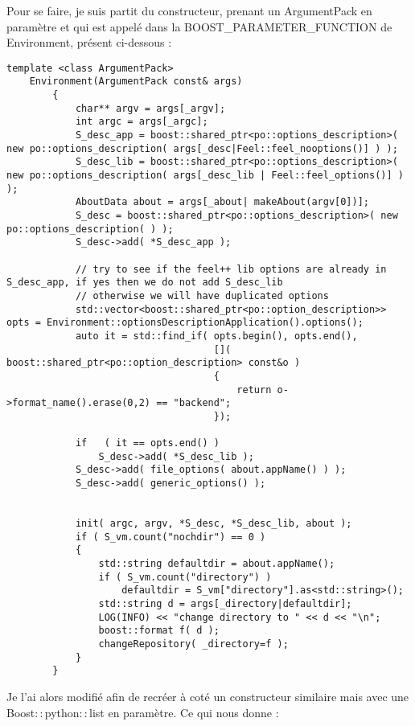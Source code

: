 \documentclass[12pt]{article}
\begin{document}
Pour se faire, je suis partit du constructeur, prenant un ArgumentPack en paramètre et qui est appelé dans la BOOST\_PARAMETER\_FUNCTION de Environment, présent ci-dessous :
\newline
\begin{lstlisting}
template <class ArgumentPack>
    Environment(ArgumentPack const& args)
        {
            char** argv = args[_argv];
            int argc = args[_argc];
            S_desc_app = boost::shared_ptr<po::options_description>( new po::options_description( args[_desc|Feel::feel_nooptions()] ) );
            S_desc_lib = boost::shared_ptr<po::options_description>( new po::options_description( args[_desc_lib | Feel::feel_options()] ) );
            AboutData about = args[_about| makeAbout(argv[0])];
            S_desc = boost::shared_ptr<po::options_description>( new po::options_description( ) );
            S_desc->add( *S_desc_app );

            // try to see if the feel++ lib options are already in S_desc_app, if yes then we do not add S_desc_lib
            // otherwise we will have duplicated options
            std::vector<boost::shared_ptr<po::option_description>> opts = Environment::optionsDescriptionApplication().options();
            auto it = std::find_if( opts.begin(), opts.end(),
                                    []( boost::shared_ptr<po::option_description> const&o )
                                    {
                                        return o->format_name().erase(0,2) == "backend";
                                    });

            if   ( it == opts.end() )
                S_desc->add( *S_desc_lib );
            S_desc->add( file_options( about.appName() ) );
            S_desc->add( generic_options() );


            init( argc, argv, *S_desc, *S_desc_lib, about );
            if ( S_vm.count("nochdir") == 0 )
            {
                std::string defaultdir = about.appName();
                if ( S_vm.count("directory") )
                    defaultdir = S_vm["directory"].as<std::string>();
                std::string d = args[_directory|defaultdir];
                LOG(INFO) << "change directory to " << d << "\n";
                boost::format f( d );
                changeRepository( _directory=f );
            }
        }

\end{lstlisting}

Je l'ai alors modifié afin de recréer à coté un constructeur similaire mais avec une Boost$::$python$::$list en paramètre. Ce qui nous donne :
\end{document}
